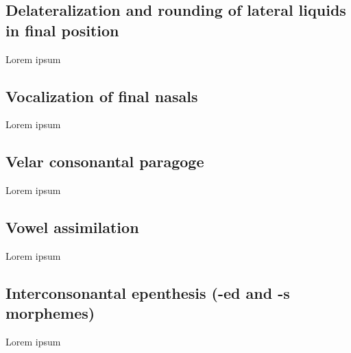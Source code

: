 \subsection{Delateralization and rounding of lateral liquids in final position}
Lorem ipsum

\subsection{Vocalization of final nasals}\label{sec:voc-nasals}
Lorem ipsum

\subsection{Velar consonantal paragoge}
Lorem ipsum

\subsection{Vowel assimilation}\label{sec:voc-assimilation}
Lorem ipsum

\subsection{Interconsonantal epenthesis (-ed and -s morphemes)}
Lorem ipsum

